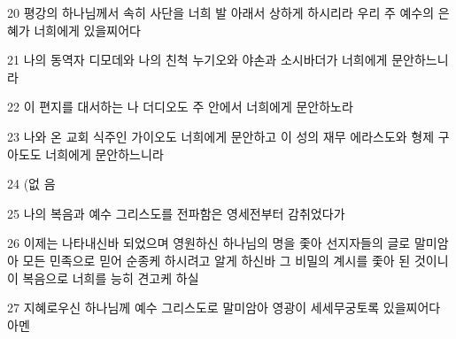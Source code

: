 \par 20 평강의 하나님께서 속히 사단을 너희 발 아래서 상하게 하시리라 우리 주 예수의 은혜가 너희에게 있을찌어다
\par 21 나의 동역자 디모데와 나의 친척 누기오와 야손과 소시바더가 너희에게 문안하느니라
\par 22 이 편지를 대서하는 나 더디오도 주 안에서 너희에게 문안하노라
\par 23 나와 온 교회 식주인 가이오도 너희에게 문안하고 이 성의 재무 에라스도와 형제 구아도도 너희에게 문안하느니라
\par 24 (없 음
\par 25 나의 복음과 예수 그리스도를 전파함은 영세전부터 감취었다가
\par 26 이제는 나타내신바 되었으며 영원하신 하나님의 명을 좇아 선지자들의 글로 말미암아 모든 민족으로 믿어 순종케 하시려고 알게 하신바 그 비밀의 계시를 좇아 된 것이니 이 복음으로 너희를 능히 견고케 하실
\par 27 지혜로우신 하나님께 예수 그리스도로 말미암아 영광이 세세무궁토록 있을찌어다 아멘


